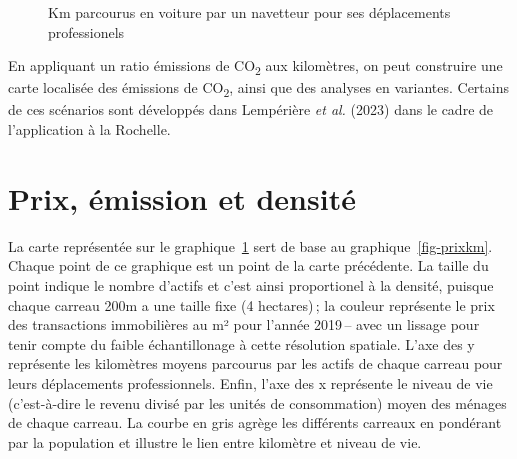 \documentclass[
  9pt,
  a4paper,
  DIV=11]{scrreprt}
\begin{document}
\begin{figure}

\caption{\label{fig-km-nav}Km parcourus en voiture par un navetteur pour
ses déplacements professionels}


\end{figure}%

En appliquant un ratio émissions de CO\textsubscript{2} aux kilomètres,
on peut construire une carte localisée des émissions de
CO\textsubscript{2}, ainsi que des analyses en variantes. Certains de
ces scénarios sont développés dans Lempérière \emph{et al.} (2023) dans
le cadre de l'application à la Rochelle.

\section{Prix, émission et
densité}\label{prix-uxe9mission-et-densituxe9}

La carte représentée sur le graphique~\ref{fig-km-nav} sert de base au
graphique~\ref{fig-prixkm}. Chaque point de ce graphique est un point de
la carte précédente. La taille du point indique le nombre d'actifs et
c'est ainsi proportionel à la densité, puisque chaque carreau 200m a une
taille fixe (4 hectares)\,; la couleur représente le prix des
transactions immobilières au m² pour l'année 2019\,-- avec un lissage
pour tenir compte du faible échantillonage à cette résolution spatiale.
L'axe des y représente les kilomètres moyens parcourus par les actifs de
chaque carreau pour leurs déplacements professionnels. Enfin, l'axe des
x représente le niveau de vie (c'est-à-dire le revenu divisé par les
unités de consommation) moyen des ménages de chaque carreau. La courbe
en gris agrège les différents carreaux en pondérant par la population et
illustre le lien entre kilomètre et niveau de vie.
\end{document}
